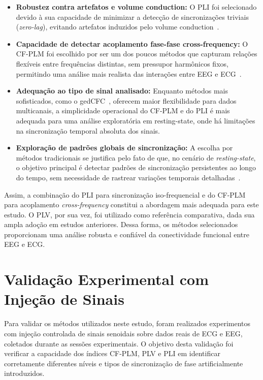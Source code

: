\begin{itemize}
  \item \textbf{Robustez contra artefatos e volume conduction:} O PLI foi selecionado devido à sua capacidade de minimizar a detecção de sincronizações triviais (\textit{zero-lag}), evitando artefatos induzidos pelo volume conduction~\cite{seraj2018cerebral, zhang2014phase}.
  
  \item \textbf{Capacidade de detectar acoplamento fase-fase cross-frequency:} O CF-PLM foi escolhido por ser um dos poucos métodos que capturam relações flexíveis entre frequências distintas, sem pressupor harmônicos fixos, permitindo uma análise mais realista das interações entre EEG e ECG~\cite{sorrentino2022detection, seraj2018cerebral, chen2023multiple}.

  \item \textbf{Adequação ao tipo de sinal analisado:} Enquanto métodos mais sofisticados, como o gedCFC~\cite{cohen2017where}, oferecem maior flexibilidade para dados multicanais, a simplicidade operacional do CF-PLM e do PLI é mais adequada para uma análise exploratória em resting-state, onde há limitações na sincronização temporal absoluta dos sinais.

  \item \textbf{Exploração de padrões globais de sincronização:} A escolha por métodos tradicionais se justifica pelo fato de que, no cenário de \textit{resting-state}, o objetivo principal é detectar padrões de sincronização persistentes ao longo do tempo, sem necessidade de rastrear variações temporais detalhadas~\cite{vanzaen2013adaptive, seraj2018cerebral}.
\end{itemize}

Assim, a combinação do PLI para sincronização iso-frequencial e do CF-PLM para acoplamento \textit{cross-frequency} constitui a abordagem mais adequada para este estudo. O PLV, por sua vez, foi utilizado como referência comparativa, dada sua ampla adoção em estudos anteriores. Dessa forma, os métodos selecionados proporcionam uma análise robusta e confiável da conectividade funcional entre EEG e ECG.


\section{Validação Experimental com Injeção de Sinais}

Para validar os métodos utilizados neste estudo, foram realizados experimentos com injeção controlada de sinais senoidais sobre dados reais de ECG e EEG, coletados durante as sessões experimentais. O objetivo desta validação foi verificar a capacidade dos índices CF-PLM, PLV e PLI em identificar corretamente diferentes níveis e tipos de sincronização de fase artificialmente introduzidos.


